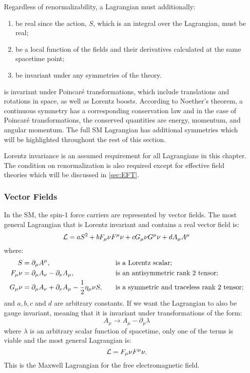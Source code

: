 \newpage

\noindent
Regardless of renormalizability, a Lagrangian must additionally:
\begin{enumerate}
  \item be real since the action, $S$, which is an integral over the Lagrangian, must be real;
  \item be a local function of the fields and their derivatives calculated at the same spacetime point;
  \item be invariant under any symmetries of the theory.
\end{enumerate}
 is invariant under Poincar\'e transformations, which include translations and rotations in space, as well as Lorentz boosts. According to Noether's theorem, a continuous symmetry has a corresponding conservation law and in the case of Poincar\'e transformations, the conserved quantities are energy, momentum, and angular momentum. The full SM Lagrangian has additional symmetries which will be highlighted throughout the rest of this section.

Lorentz invariance is an assumed requirement for all Lagrangians in this chapter. The condition on renormalization is also required except for effective field theories which will be discussed in \cref{sec:EFT}. 

\subsubsection{Vector Fields}
In the SM, the spin-1 force carriers are represented by vector fields. The most general Lagrangian that is Lorentz invariant and contains a real vector field is:
\begin{equation}
  \mathcal{L} = aS^2 + b F_\mu\nu F^\mu\nu + c G_\mu\nu G^\mu\nu + d A_\mu A^\mu
\end{equation}
where:
\begin{align}
  S &= \partial_\mu A^\mu,\quad &&\text{is a Lorentz scalar}; \\
  F_\mu\nu &= \partial_\mu A_\nu - \partial_\nu A_\mu,\quad &&\text{is an antisymmetric rank 2 tensor}; \label{eq:fmn} \\
  G_\mu\nu &= \partial_\mu A_\nu + \partial_\nu A_\mu - \frac{1}{2} \eta_\mu\nu S,\quad &&\text{is a symmetric and traceless rank 2 tensor};
\end{align}
and $a, b, c$ and $d$ are arbitrary constants. If we want the Lagrangian to also be gauge invariant, meaning that it is invariant under transformations of the form:
\begin{equation}
  A_\mu \to A_\mu - \partial_\mu \lambda
  \label{eq:gauge_transformation}
\end{equation}
where $\lambda$ is an arbitrary scalar function of spacetime, only one of the terms is viable and the most general Lagrangian is:
\begin{equation}
  \mathcal{L} = F_\mu\nu F^\mu\nu .
\end{equation}
This is the Maxwell Lagrangian for the free electromagnetic field.

